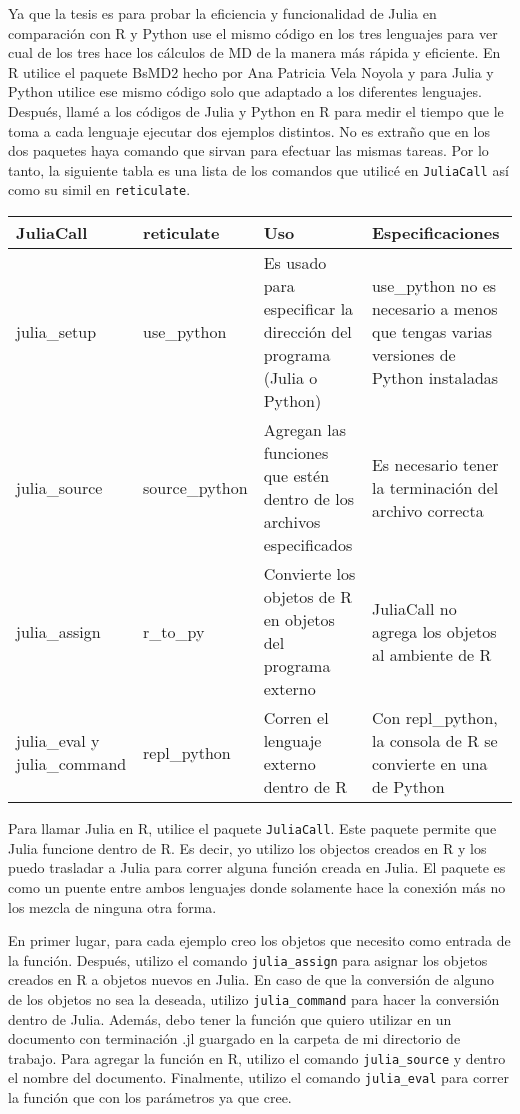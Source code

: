 Ya que la tesis es para probar la eficiencia y funcionalidad de Julia en comparación con R y Python use el mismo código en los tres lenguajes para ver cual de los tres hace los cálculos de MD de la manera más rápida y eficiente. En R utilice el paquete BsMD2 hecho por Ana Patricia Vela Noyola y para Julia y Python utilice ese mismo código solo que adaptado a los diferentes lenguajes. Después, llamé a los códigos de Julia y Python en R para medir el tiempo que le toma a cada lenguaje ejecutar dos ejemplos distintos. No es extraño que en los dos paquetes haya comando que sirvan para efectuar las mismas tareas. Por lo tanto, la siguiente tabla es una lista de los comandos que utilicé en \texttt{JuliaCall} así como su simil en \texttt{reticulate}.

\begin{tabular}{ |p{2cm}|p{2.5cm}|p{3cm}|p{3cm}|  }
	\hline
	JuliaCall & reticulate & Uso & Especificaciones\\
	\hline
	julia\_setup   & use\_python    & Es usado para especificar la dirección del programa (Julia o Python) &   use\_python no es necesario a menos que tengas varias versiones de Python instaladas\\
	\hline
	julia\_source &   source\_python  & Agregan las funciones que estén dentro de los archivos especificados   & Es necesario tener la terminación del archivo correcta\\
	\hline
	julia\_assign & r\_to\_py &  Convierte los objetos de R en objetos del programa externo &  JuliaCall no agrega los objetos al ambiente de R\\
	\hline
	julia\_eval y julia\_command  & repl\_python\(\) & Corren el lenguaje externo dentro de R&  Con repl\_python, la consola de R se convierte en una de Python\\

	\hline
\end{tabular}

Para llamar Julia en R, utilice el paquete \texttt{JuliaCall}. Este paquete permite que Julia funcione dentro de R. Es decir, yo utilizo los objectos creados en R y los puedo trasladar a Julia para correr alguna función creada en Julia. El paquete es como un puente entre ambos lenguajes donde solamente hace la conexión más no los mezcla de ninguna otra forma.


En primer lugar, para cada ejemplo creo los objetos que necesito como entrada de la función. Después, utilizo el comando \texttt{julia\_assign} para asignar los objetos creados en R a objetos nuevos en Julia. En caso de que la conversión de alguno de los objetos no sea la deseada, utilizo \texttt{julia\_command} para hacer la conversión dentro de Julia. Además, debo tener la función que quiero utilizar en un documento con terminación \textsf{.jl} guargado en la carpeta de mi directorio de trabajo. Para agregar la función en R, utilizo el comando \texttt{julia\_source} y dentro el nombre del documento. Finalmente, utilizo el comando \texttt{julia\_eval} para correr la función que con los parámetros ya que cree. 

